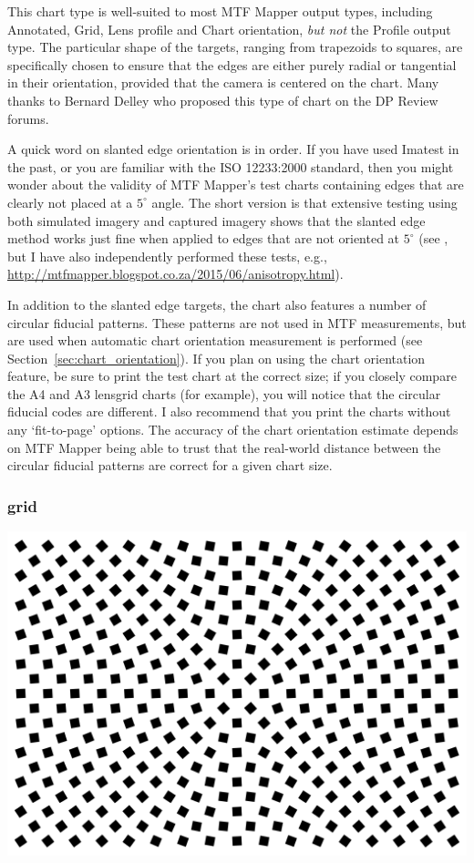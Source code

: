 \documentclass[a4paper]{article}
\begin{document}
\vspace{1ex}
This chart type is well-suited to most MTF Mapper output types, including
\textsf{Annotated}, \textsf{Grid}, \textsf{Lens profile} and \textsf{Chart
orientation}, \emph{but not} the \textsf{Profile} output type. The
particular shape of the targets, ranging from trapezoids to squares,
are specifically chosen to ensure that the edges are either purely radial or
tangential in their orientation, provided that the camera is centered on the
chart. Many thanks to Bernard Delley who proposed this type of chart on the
DP Review forums.

A quick word on slanted edge orientation is in order. If you have used
Imatest in the past, or you are familiar with the ISO 12233:2000 standard,
then you might wonder about the validity of MTF Mapper's test charts
containing edges that are clearly not placed at a $5^\circ$ angle. The short
version is that extensive testing using both simulated imagery and captured
imagery shows that the slanted edge method works just fine when applied to
edges that are not oriented at $5^\circ$ (see \cite{khom}, but I have also
independently performed these tests, e.g.,
\url{http://mtfmapper.blogspot.co.za/2015/06/anisotropy.html}).

In addition to the slanted edge targets, the chart also features a number of
circular fiducial patterns. These patterns are not used in MTF measurements,
but are used when automatic chart orientation measurement is performed
(see Section~\ref{sec:chart_orientation}). If you plan on using the chart
orientation feature, be sure to print the test chart at the correct size; if you closely
compare the A4 and A3 lensgrid charts (for example), you will notice that
the circular fiducial codes are different. I also recommend that you print
the charts without any `fit-to-page' options. The accuracy of the chart
orientation estimate depends on MTF Mapper being able to trust that the 
real-world distance between the circular fiducial patterns are correct for a
given chart size.

\subsubsection{grid}

\parbox{\textwidth}{
\centering
\includegraphics[width=\textwidth]{figures/chart_grid}
}
\vspace{1ex}
\end{document}
